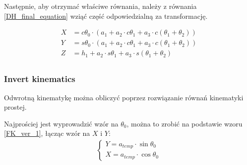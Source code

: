 \documentclass[a4paper,13pt]{article}
\begin{document}

Następnie, aby otrzymać właściwe równania, należy z równania \ref{DH_final_equation} wziąć część odpowiedzialną za transformację.

\begin{equation}
\begin{split}
X &= c\theta_0 \cdot \left( a_1 + a_2 \cdot c\theta_1 + a_3  \cdot c\left( \theta_1 + \theta_2 \right) \right)\\
Y &= s\theta_0 \cdot \left( a_1 + a_2 \cdot c\theta_1 + a_3  \cdot c\left( \theta_1 + \theta_2 \right) \right)\\
Z &= h_1 + a_2 \cdot s\theta_1 + a_3 \cdot s\left( \theta_1 + \theta_2 \right)\\
\end{split}
\end{equation}



\subsubsection{Invert kinematics}
Odwrotną kinematykę można obliczyć poprzez rozwiązanie równań kinematyki prostej.

Najprościej jest wyprowadzić wzór na $\theta_0$, można to zrobić na podstawie wzoru \ref{FK_ver_1}, łącząc wzór na $X$ i $Y$:
\begin{equation}
\begin{split}
\begin{cases}
Y = a_{temp} \cdot \sin{\theta_0}\\
X = a_{temp} \cdot \cos{\theta_0}
\end{cases}
\end{split}
\end{equation}
\end{document}
